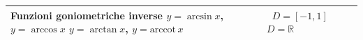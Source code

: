 \begin{tabularx}{\textwidth}{XXX}
  \textbf{Funzioni goniometriche inverse} \newline 
\(y=\arcsin{x}\), \(y=\arccos{x}\) \newline \newline \(y=\arctan x\), 
\(y=\text{arccot}\,x\)
  & \(\,\) \newline \newline \(D=[-1,1]\) \newline  \newline 
\(D=\mathbb{R}\)
  &  \\
  \midrule
  
\end{tabularx}
% 

\begin{tabularx}{\textwidth}{XXX}
  \midrule


\end{tabularx}
